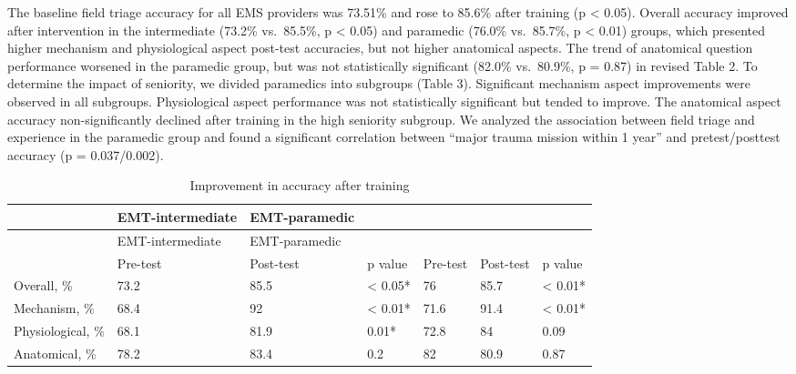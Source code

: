 \documentclass[
  20pt
]{article}
\begin{document}
\begin{multicols}{2}
The baseline field triage accuracy for all EMS providers was 73.51\% and
rose to 85.6\% after training (p \textless{} 0.05). Overall accuracy
improved after intervention in the intermediate (73.2\% vs.~85.5\%, p
\textless{} 0.05) and paramedic (76.0\% vs.~85.7\%, p \textless{} 0.01)
groups, which presented higher mechanism and physiological aspect
post-test accuracies, but not higher anatomical aspects. The trend of
anatomical question performance worsened in the paramedic group, but was
not statistically significant (82.0\% vs.~80.9\%, p = 0.87) in revised
Table 2. To determine the impact of seniority, we divided paramedics
into subgroups (Table 3). Significant mechanism aspect improvements were
observed in all subgroups. Physiological aspect performance was not
statistically significant but tended to improve. The anatomical aspect
accuracy non-significantly declined after training in the high seniority
subgroup. We analyzed the association between field triage and
experience in the paramedic group and found a significant correlation
between ``major trauma mission within 1 year'' and pretest/posttest
accuracy (p = 0.037/0.002).
\end{multicols}


\begin{longtable}[]{@{}lllllll@{}}
\caption{Improvement in accuracy after training}\tabularnewline
\toprule
& EMT-intermediate & EMT-paramedic & & & & \\
\midrule
\endfirsthead
\toprule
& EMT-intermediate & EMT-paramedic & & & & \\
\midrule
\endhead
& Pre-test & Post-test & p value & Pre-test & Post-test & p value \\
Overall, \% & 73.2 & 85.5 & \textless{} 0.05* & 76 & 85.7 & \textless{}
0.01* \\
Mechanism, \% & 68.4 & 92 & \textless{} 0.01* & 71.6 & 91.4 &
\textless{} 0.01* \\
Physiological, \% & 68.1 & 81.9 & 0.01* & 72.8 & 84 & 0.09 \\
Anatomical, \% & 78.2 & 83.4 & 0.2 & 82 & 80.9 & 0.87 \\
\bottomrule
\end{longtable}
\end{document}
